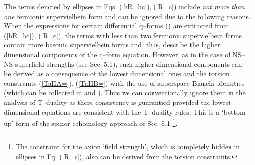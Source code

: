 \documentclass[a4paper,11pt]{article}
\begin{document}
The terms denoted by ellipses in Eqs. (\ref{hR=hc}), (\ref{R=c})
include {\sl not more than one}  fermionic supervielbein form
and can be ignored due to the following reasons.  
When the expressions for certain differential q--forms (\coordHE{}) are extracted 
from  (\ref{hR=hc}), (\ref{R=c}), the terms with less than two 
fermionic supervielbein forms contain more bosonic supervielbein forms  
and, thus, describe  the higher dimensional components of the 
q--form equation. 
However, as in the case of NS--NS superfield strengths (see Sec. 5.1), 
such higher dimensional components  
can be derived as a consequence of the 
lowest dimensional ones and the torsion constraints 
(\ref{TaIIA=}), (\ref{TaIIB=})  
with the use of superspace Bianchi identities 
(which can be collected in \coordHE{} 
and \coordHE{}). 
Thus we can conventionally ignore them in the analysis of T--duality as there 
consistency is guarantied provided the lowest dimensional equations 
are consistent with the T--duality rules.  
This is a `bottom--up' form of the spinor cohomology approach of Sec. 5.1
\footnote{The constraint 
\coordHE{} for the axion `field strength', 
which is completely hidden in ellipses in Eq. (\ref{R=c}),  
also can be derived from the torsion constraints.}.  
\end{document}
